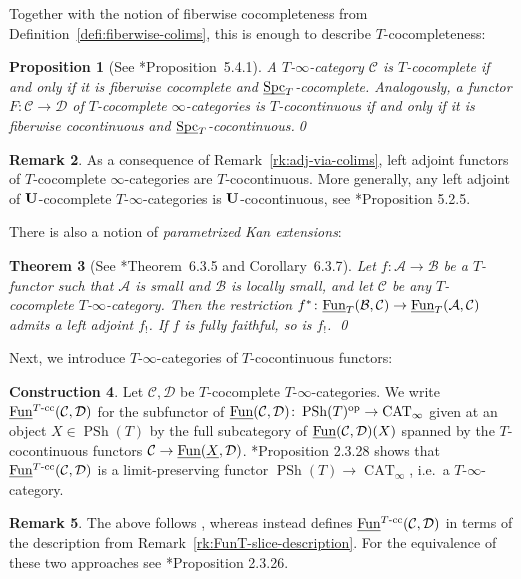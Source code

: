 \documentclass[reqno]{memo-l}
\theoremstyle{mythm}
\newtheorem{thm}{Theorem}[section]
\newtheorem{prop}[thm]{Proposition}
\theoremstyle{definition}
\newtheorem{rk}[thm]{Remark}
\newtheorem{constr}[thm]{Construction}
\numberwithin{equation}{section}
\newcommand{\Aa}{{\mathcal{A}}}
\newcommand{\Bb}{{\mathcal{B}}}
\newcommand{\Cc}{{\mathcal{C}}}
\newcommand{\Dd}{{\mathcal{D}}}
\DeclareMathOperator{\Spc}{Spc}
\DeclareMathOperator{\CAT}{CAT}
\newcommand{\Fun}{{\textup{Fun}}}
\DeclareMathOperator{\PSh}{PSh}
\newcommand{\cat}[1]{\textbf{\textup{#1}}}
\newcommand{\op}{{\textup{op}}}
\newcommand{\ulhelper}[2]{\underline{\setbox0=\hbox{$#1#2$}\dp0=0.4pt \box0\relax}}
\newcommand{\ul}[1]{{\mathpalette\ulhelper{#1}}\hbox{\rule[-2pt]{0pt}{0pt}}}
\begin{document}
Together with the notion of fiberwise cocompleteness from Definition~\ref{defi:fiberwise-colims}, this is enough to describe $T$-cocompleteness:

\begin{prop}[See \cite{martiniwolf2021limits}*{Proposition~5.4.1}]
    A $T$-$\infty$-category $\Cc$ is $T$-cocomplete if and only if it is fiberwise cocomplete and $\ul\Spc_T$-cocomplete. Analogously, a functor $F\colon\Cc\to\Dd$ of $T$-cocomplete $\infty$-categories is $T$-cocontinuous if and only if it is fiberwise cocontinuous and $\ul\Spc_T$-cocontinuous.\qed
\end{prop}

\begin{rk}
    As a consequence of Remark~\ref{rk:adj-via-colims}, left adjoint functors of $T$-cocomplete $\infty$-categories are $T$-cocontinuous. More generally, any left adjoint of $\cat{U}$-cocomplete $T$-$\infty$-categories is $\cat{U}$-cocontinuous, see \cite{martiniwolf2021limits}*{Proposition 5.2.5}.
\end{rk}

There is also a notion of \emph{parametrized Kan extensions}:

\begin{thm}[See \cite{martiniwolf2021limits}*{Theorem~6.3.5 and Corollary~6.3.7}]\label{thm:Kan-extension}
   Let $f\colon\Aa\to\Bb$ be a $T$-functor such that $\Aa$ is small and $\Bb$ is locally small, and let $\Cc$ be any $T$-cocomplete $T$-$\infty$-category. Then the restriction $f^*\colon\ul\Fun_T(\Bb,\Cc)\to\ul\Fun_T(\Aa,\Cc)$ admits a left adjoint $f_!$. If $f$ is fully faithful, so is $f_!$. \qed
\end{thm}

Next, we introduce $T$-$\infty$-categories of $T$-cocontinuous functors:

\begin{constr}\label{constr:Fun-T-cc}
    Let $\Cc,\Dd$ be $T$-cocomplete $T$-$\infty$-categories. We write $\ul\Fun^\text{$T$-cc}(\Cc,\Dd)$ for the subfunctor of $\ul\Fun(\Cc,\Dd)\colon\PSh(T)^\op\to\CAT_\infty$ given at an object $X\in\PSh(T)$ by the full subcategory of $\ul\Fun(\Cc,\Dd)(X)$ spanned by the $T$-cocontinuous functors $\Cc\to\ul\Fun(\ul X,\Dd)$. \cite{CLL_Global}*{Proposition 2.3.28} shows that $\ul\Fun^\text{$T$-cc}(\Cc,\Dd)$ is a limit-preserving functor $\PSh(T)\to\CAT_\infty$, i.e.\ a $T$-$\infty$-category.
\end{constr}

\begin{rk}
    The above follows \cite{CLL_Global}, whereas \cite{martiniwolf2021limits} instead defines $\ul\Fun^\text{$T$-cc}(\Cc,\Dd)$ in terms of the description from Remark~\ref{rk:FunT-slice-description}. For the equivalence of these two approaches see \cite{CLL_Global}*{Proposition 2.3.26}.
\end{rk}
\end{document}
